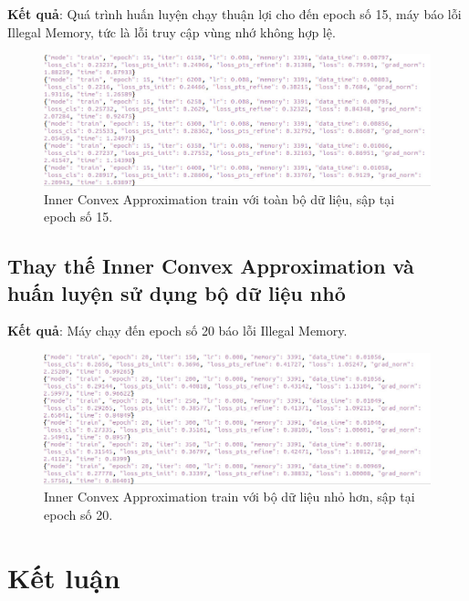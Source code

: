 \documentclass[12pt,a4paper,openany,oneside]{report}
\begin{document}
\textbf{Kết quả}: Quá trình huấn luyện chạy thuận lợi cho đến epoch số 15, máy báo lỗi Illegal Memory, tức là lỗi truy cập vùng nhớ không hợp lệ.

\begin{figure}[ht!]
	\begin{center}
		\includegraphics[width=450px]{./inner_fulldata_epoch15.JPG}
		\caption{Inner Convex Approximation train với toàn bộ dữ liệu, sập tại epoch số 15.}
		\label{inner_fulldata_epoch15}
	\end{center}
\end{figure} 
\section{Thay thế Inner Convex Approximation và huấn luyện sử dụng bộ dữ liệu nhỏ}

\textbf{Kết quả}: Máy chạy đến epoch số 20 báo lỗi Illegal Memory.

\begin{figure}[ht!]
	\begin{center}
		\includegraphics[width=450px]{./inner_smalldata_epoch20.JPG}
		\caption{Inner Convex Approximation train với bộ dữ liệu nhỏ hơn, sập tại epoch số 20.}
		\label{inner_smalldata_epoch20}
	\end{center}
\end{figure} 

\chapter*{{Kết luận}}
\end{document}
